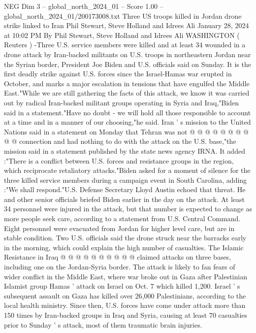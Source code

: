 \begin{textsample}{NEG Dim 3 – global\_north\_2024\_01 – Score 1.00 – global\_north\_2024\_01/200173008.txt}  \label{ex:f3_neg_239}
Three US troops killed in Jordan drone strike linked to Iran Phil Stewart, Steve Holland and Idrees Ali January 28, 2024 at 10:02 PM By Phil Stewart, Steve Holland and Idrees Ali WASHINGTON ( Reuters ) -Three U.S. service members were killed and at least 34 wounded in a drone attack by Iran-backed militants on U.S. troops in northeastern Jordan near the Syrian border, President Joe Biden and U.S. officials said on Sunday.
It is the first deadly strike against U.S. forces since the Israel-Hamas war erupted in October, and marks a major escalation in tensions that have engulfed the Middle East."While we are still gathering the facts of this attack, we know it was carried out by radical Iran-backed militant groups operating in Syria and Iraq,"Biden said in a statement."Have no doubt - we will hold all those responsible to account at a time and in a manner of our choosing,"he said.
Iran ' s mission to the United Nations said in a statement on Monday that Tehran was not @ @ @ @ @ @ @ @ @ @ connection and had nothing to do with the attack on the U.S. base,"the mission said in a statement published by the state news agency IRNA.
It added :"There is a conflict between U.S. forces and resistance groups in the region, which reciprocate retaliatory attacks."Biden asked for a moment of silence for the three killed service members during a campaign event in South Carolina, adding :"We shall respond."U.S.
Defense Secretary Lloyd Austin echoed that threat.
He and other senior officials briefed Biden earlier in the day on the attack.
At least 34 personnel were injured in the attack, but that number is expected to change as more people seek care, according to a statement from U.S.
Central Command.
Eight personnel were evacuated from Jordan for higher level care, but are in stable condition.
Two U.S. officials said the drone struck near the barracks early in the morning, which could explain the high number of casualties.
The Islamic Resistance in Iraq @ @ @ @ @ @ @ @ @ @ claimed attacks on three bases, including one on the Jordan-Syria border.
The attack is likely to fan fears of wider conflict in the Middle East, where war broke out in Gaza after Palestinian Islamist group Hamas ' attack on Israel on Oct. 7 which killed 1,200.
Israel ' s subsequent assault on Gaza has killed over 26,000 Palestinians, according to the local health ministry.
Since then, U.S. forces have come under attack more than 150 times by Iran-backed groups in Iraq and Syria, causing at least 70 casualties prior to Sunday ' s attack, most of them traumatic brain injuries.

\end{textsample}
